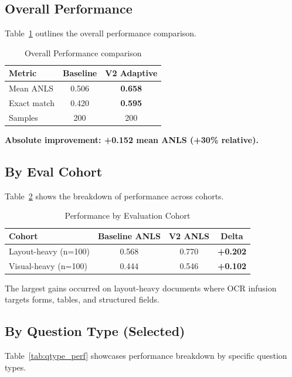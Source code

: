 \documentclass[11pt,a4paper]{article}
\begin{document}
\subsection{Overall Performance}
Table~\ref{tab:overall_perf} outlines the overall performance comparison.

\begin{table}[H]
\centering
\caption{Overall Performance comparison}
\label{tab:overall_perf}
\begin{tabular}{|l|c|c|}
\hline
\textbf{Metric} & \textbf{Baseline} & \textbf{V2 Adaptive} \\ \hline
Mean ANLS & 0.506 & \textbf{0.658} \\ \hline
Exact match & 0.420 & \textbf{0.595} \\ \hline
Samples & 200 & 200 \\ \hline
\end{tabular}
\end{table}
\textbf{Absolute improvement: +0.152 mean ANLS (+30\% relative).}

\subsection{By Eval Cohort}
Table~\ref{tab:cohort_perf} shows the breakdown of performance across cohorts.

\begin{table}[H]
\centering
\caption{Performance by Evaluation Cohort}
\label{tab:cohort_perf}
\begin{tabular}{|l|c|c|c|}
\hline
\textbf{Cohort} & \textbf{Baseline ANLS} & \textbf{V2 ANLS} & \textbf{Delta} \\ \hline
Layout-heavy (n=100) & 0.568 & 0.770 & \textbf{+0.202} \\ \hline
Visual-heavy (n=100) & 0.444 & 0.546 & \textbf{+0.102} \\ \hline
\end{tabular}
\end{table}
The largest gains occurred on layout-heavy documents where OCR infusion targets forms, tables, and structured fields.

\subsection{By Question Type (Selected)}
Table~\ref{tab:qtype_perf} showcases performance breakdown by specific question types.
\end{document}
